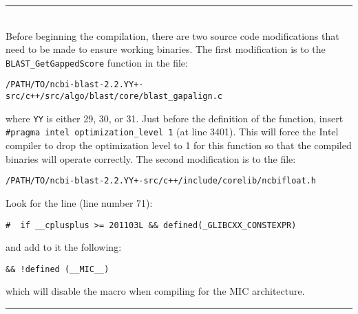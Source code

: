 \documentclass[10pt]{article}
\begin{document}
\noindent \rule{16cm}{0.4pt}

\\
\noindent Before beginning the compilation, there are two source code modifications that need to be made to ensure working binaries.  The first modification is to the \verb^BLAST_GetGappedScore^ function in the file:
\begin{verbatim}
/PATH/TO/ncbi-blast-2.2.YY+-src/c++/src/algo/blast/core/blast_gapalign.c
\end{verbatim}
\noindent where \verb^YY^ is either 29, 30, or 31. Just before the definition of the function, insert \verb^#pragma intel optimization_level 1^ (at line 3401).  This will force the Intel compiler to drop the optimization level to 1 for this function so that the
compiled binaries will operate correctly.  The second modification is to the file:
\begin{verbatim}
/PATH/TO/ncbi-blast-2.2.YY+-src/c++/include/corelib/ncbifloat.h
\end{verbatim}
\noindent Look for the line (line number 71):
\begin{verbatim}
#  if __cplusplus >= 201103L && defined(_GLIBCXX_CONSTEXPR)
\end{verbatim}
\noindent and add to it the following:
\begin{verbatim}
&& !defined (__MIC__)
\end{verbatim}
\noindent which will disable the macro when compiling for the MIC architecture.

\noindent \rule{16cm}{0.4pt} \\
\end{document}
